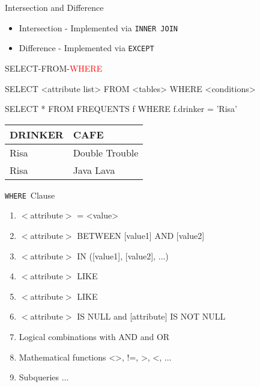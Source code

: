 \documentclass[aspectratio=169]{beamer}
\newcommand{\WHERE}{\texttt{WHERE}}
\begin{document}
\begin{frame}{Intersection and Difference}

\begin{itemize}
\item Intersection - Implemented via \texttt{INNER JOIN}
\item Difference - Implemented via \texttt{EXCEPT} 
\end{itemize}
\end{frame}

\begin{frame}[fragile]{SELECT-FROM-{\textcolor{red}{WHERE}}}

\begin{SQL}
SELECT <attribute list>
FROM <tables>
WHERE <conditions>

SELECT * 
FROM FREQUENTS f
WHERE f.drinker = 'Risa'
\end{SQL}

\begin{tabular}{|l|l| }  \hline
\textrm{DRINKER} & \textrm{CAFE} \\ \hline
Risa & Double Trouble \\ \hline
Risa & Java Lava  \\ \hline
\end{tabular}


\end{frame}
\begin{frame}{\WHERE\ Clause}

\begin{enumerate}
\item $<$attribute$>$ = <value>
\item $<$attribute$>$ BETWEEN [value1] AND [value2]
\item $<$attribute$>$ IN ([value1], [value2], $\ldots$)
\item $<$attribute$>$ LIKE \textquotesingle
\item $<$attribute$>$ LIKE \textquotesingle
\item $<$attribute$>$ IS NULL and [attribute] IS NOT NULL
\item Logical combinations with AND and OR
\item Mathematical functions <>, !=, >, <, $\ldots$
\item Subqueries $\ldots$

\end{enumerate}
\end{frame}
\end{document}
